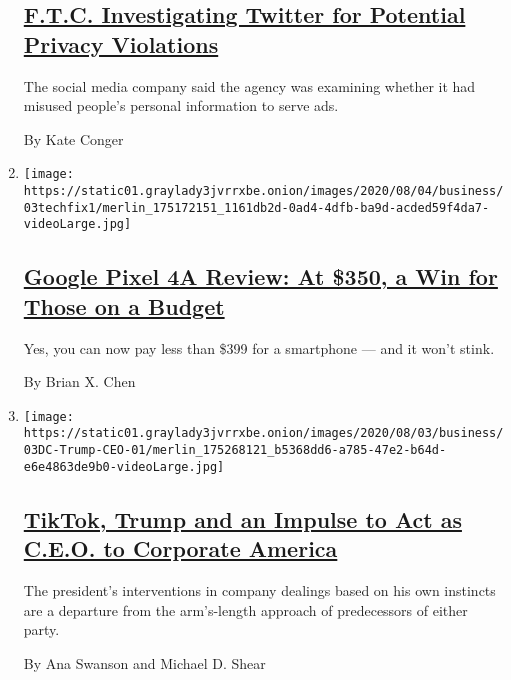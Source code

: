 \begin{enumerate}
  \hypertarget{ftc-investigating-twitter-for-potential-privacy-violations}{%
  \subsection{\texorpdfstring{\href{/2020/08/03/technology/ftc-twitter-privacy-violations.html}{F.T.C.
  Investigating Twitter for Potential Privacy
  Violations}}{F.T.C. Investigating Twitter for Potential Privacy Violations}}\label{ftc-investigating-twitter-for-potential-privacy-violations}}

  The social media company said the agency was examining whether it had
  misused people's personal information to serve ads.

  By Kate Conger
\item
  \texttt{[image: https://static01.graylady3jvrrxbe.onion/images/2020/08/04/business/03techfix1/merlin\_175172151\_1161db2d-0ad4-4dfb-ba9d-acded59f4da7-videoLarge.jpg]}

  \hypertarget{google-pixel-4a-review-at-350-a-win-for-those-on-a-budget-1}{%
  \subsection{\texorpdfstring{\href{/2020/08/03/technology/personaltech/google-pixel-4a-review.html}{Google
  Pixel 4A Review: At \$350, a Win for Those on a
  Budget}}{Google Pixel 4A Review: At \$350, a Win for Those on a Budget}}\label{google-pixel-4a-review-at-350-a-win-for-those-on-a-budget-1}}

  Yes, you can now pay less than \$399 for a smartphone --- and it won't
  stink.

  By Brian X. Chen
\item
  \texttt{[image: https://static01.graylady3jvrrxbe.onion/images/2020/08/03/business/03DC-Trump-CEO-01/merlin\_175268121\_b5368dd6-a785-47e2-b64d-e6e4863de9b0-videoLarge.jpg]}

  \hypertarget{tiktok-trump-and-an-impulse-to-act-as-ceo-to-corporate-america}{%
  \subsection{\texorpdfstring{\href{/2020/08/03/business/economy/trump-tiktok-china-business.html}{TikTok,
  Trump and an Impulse to Act as C.E.O. to Corporate
  America}}{TikTok, Trump and an Impulse to Act as C.E.O. to Corporate America}}\label{tiktok-trump-and-an-impulse-to-act-as-ceo-to-corporate-america}}

  The president's interventions in company dealings based on his own
  instincts are a departure from the arm's-length approach of
  predecessors of either party.

  By Ana Swanson and Michael D. Shear
\end{enumerate}

